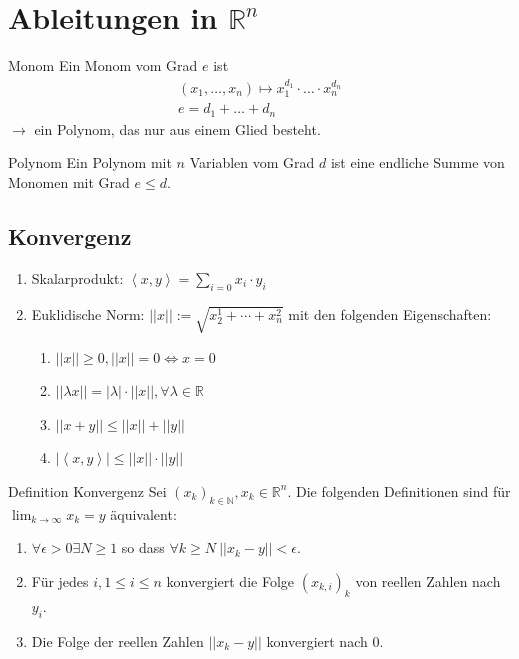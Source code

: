 \documentclass[a4paper,10pt]{article}
\def\R{\mathbb{R}}
\begin{document}
\section{Ableitungen in \texorpdfstring{\(\R^n\)}{Rⁿ}}
\begin{subbox}{Monom}
  Ein Monom vom Grad \(e\) ist
  \begin{align*}
    (x_1, \ldots, x_n) \mapsto x_1^{d_1}\cdot \ldots \cdot x_n^{d_n} \\
    e = d_1 + \ldots + d_n 
  \end{align*}
  \(\to\) ein Polynom, das nur aus einem Glied besteht.
\end{subbox}
\begin{mainbox}{Polynom}
  Ein Polynom mit \(n\) Variablen vom Grad \(d\) ist eine endliche Summe von Monomen mit Grad \(e \le d\).
\end{mainbox}

\subsection{Konvergenz}
\begin{enumerate}
  \item Skalarprodukt: \(\left< x,y\right> = \sum_{i=0} x_i \cdot y_i\)
  \item Euklidische Norm: \(||x|| := \sqrt{x_2^1 + \cdots + x_n^2}\) mit den folgenden Eigenschaften:
  \begin{enumerate}
    \item \(||x|| \ge 0, ||x|| = 0 \iff x = 0\)
    \item \(||\lambda x|| = |\lambda| \cdot ||x||, \forall \lambda \in \R\)
    \item \(||x+y|| \le ||x|| + ||y||\)
    \item \(|\left<x,y\right>| \le ||x|| \cdot ||y||\)
  \end{enumerate}
\end{enumerate}

\begin{mainbox}{Definition Konvergenz}
  Sei \((x_k)_{k \in \mathbb{N}}, x_k \in \R^n\). Die folgenden Definitionen sind für \(\lim_{k\to\infty}x_k = y\) äquivalent:
  \begin{enumerate}
    \item \(\forall \epsilon > 0 \exists N \ge 1\) so dass \(\forall k \ge N \ ||x_k - y|| < \epsilon\).
    \item Für jedes \(i, 1 \le i \le n\) konvergiert die Folge \((x_{k,i})_k\) von reellen Zahlen nach \(y_i\).
    \item Die Folge der reellen Zahlen \(||x_k - y||\) konvergiert nach \(0\).
  \end{enumerate}
\end{mainbox}
\end{document}
